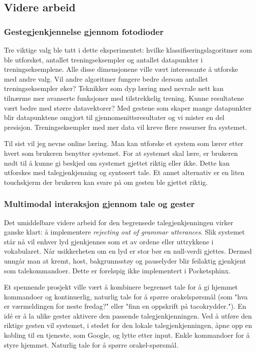 \subsection{Videre arbeid}
\label{ch:videre}
\subsubsection*{Gestegjenkjennelse gjennom fotodioder}
Tre viktige valg ble tatt i dette eksperimentet: hvilke klassifiseringslagoritmer som ble utforsket, antallet treningseksempler og antallet datapunkter i treningseksemplene. Alle disse dimensjonene ville vært interessante å utforske med andre valg. Vil andre algoritmer fungere bedre dersom antallet treningseksempler øker? Teknikker som dyp læring med nevrale nett kan tilnærme mer avanserte funksjoner med tilstrekkelig trening. Kunne resultatene vært bedre med større datavektorer? Med gestene som skaper mange datapunkter blir datapunktene omgjort til gjennomsnittsresultater og vi mister en del presisjon. Treningseksempler med mer data vil kreve flere ressurser fra systemet.

Til sist vil jeg nevne online læring. Man kan utforske et system som lærer etter hvert som brukeren benytter systemet. For at systemet skal lære, er brukeren nødt til å kunne gi beskjed om systemet gjettet riktig eller ikke. Dette kan utforskes med talegjenkjenning og syntesert tale. Et annet alternativ er en liten touchskjerm der brukeren kan svare på om gesten ble gjettet riktig.\\

\subsubsection*{Multimodal interaksjon gjennom tale og gester}
Det umiddelbare videre arbeid for den begrensede talegjenkjenningen virker ganske klart: å implementere \emph{rejecting out of grammar utterances}. Slik systemet står nå vil enhver lyd gjenkjennes som et av ordene eller uttrykkene i vokabularet. Når usikkerheten om en lyd er stor bør en null-verdi gjettes. Dermed unngår man at kremt, host, bakgrunnsstøy og pauselyder blir feilaktig gjenkjent som talekommandoer. Dette er foreløpig ikke implementert i Pocketsphinx.

Et spennende prosjekt ville vært å kombinere begrenset tale for å gi hjemmet kommandoer og kontinuerlig, naturlig tale for å spørre orakelspørsmål (som "hva er værmeldingen for neste fredag?" eller "finn en oppskrift på tacokrydder."). En idé er å la ulike gester aktivere den passende talegjenkjenningen. Ved å utføre den riktige gesten vil systemet, i stedet for den lokale talegjenkjenningen, åpne opp en kobling til en tjeneste, som Google, og lytte etter input. Enkle kommandoer for å styre hjemmet. Naturlig tale for å spørre orakel-spørsmål.

